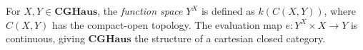 For $X, Y \in \mathbf{CGHaus}$, the \emph{function space} $Y^X$ is defined as $k(C(X, Y))$, where $C(X, Y)$ has the compact-open topology. The evaluation map $e: Y^X \times X \to Y$ is continuous, giving $\mathbf{CGHaus}$ the structure of a cartesian closed category.
